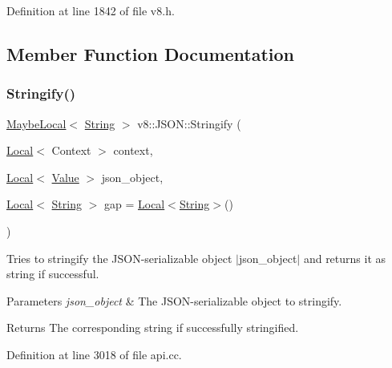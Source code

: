 Definition at line 1842 of file v8.\+h.



\subsection{Member Function Documentation}
\mbox{\label{classv8_1_1JSON_a2d760d688469ecf890cc9bf2d1b5b966}} 
\subsubsection{\texorpdfstring{Stringify()}{Stringify()}}
{\footnotesize\ttfamily \mbox{\hyperlink{classv8_1_1MaybeLocal}{Maybe\+Local}}$<$ \mbox{\hyperlink{classv8_1_1String}{String}} $>$ v8\+::\+J\+S\+O\+N\+::\+Stringify (\begin{DoxyParamCaption}\item[{\mbox{\hyperlink{classv8_1_1Local}{Local}}$<$ Context $>$}]{context,  }\item[{\mbox{\hyperlink{classv8_1_1Local}{Local}}$<$ \mbox{\hyperlink{classv8_1_1Value}{Value}} $>$}]{json\+\_\+object,  }\item[{\mbox{\hyperlink{classv8_1_1Local}{Local}}$<$ \mbox{\hyperlink{classv8_1_1String}{String}} $>$}]{gap = {\ttfamily \mbox{\hyperlink{classv8_1_1Local}{Local}}$<$\mbox{\hyperlink{classv8_1_1String}{String}}$>$()} }\end{DoxyParamCaption})\hspace{0.3cm}{\ttfamily [static]}}

Tries to stringify the J\+S\+O\+N-\/serializable object $\vert$json\+\_\+object$\vert$ and returns it as string if successful.


\begin{DoxyParams}{Parameters}
{\em json\+\_\+object} & The J\+S\+O\+N-\/serializable object to stringify. \\
\hline
\end{DoxyParams}
\begin{DoxyReturn}{Returns}
The corresponding string if successfully stringified. 
\end{DoxyReturn}


Definition at line 3018 of file api.\+cc.

\mbox{\label{classv8_1_1JSON_acc5421b3e5d85d3788a1e6cb59403393}} 
